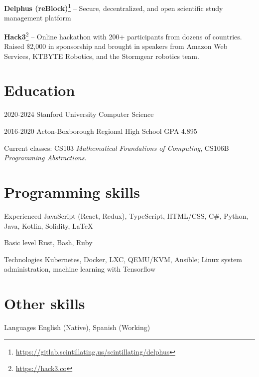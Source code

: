 \documentclass[paper=letter]{tccv}
\begin{document}
\textbf{Delphus
(reBlock)}\footnote{\url{https://gitlab.scintillating.us/scintillating/delphus}}
-- Secure, decentralized, and open scientific study management platform

\textbf{Hack3}\footnote{\url{https://hack3.co}} -- Online hackathon with 200+
participants from dozens of countries. Raised \$2,000 in sponsorship and brought
in speakers from Amazon Web Services, KTBYTE Robotics, and the Stormgear
robotics team. 

\textbf{}

\section{Education}

\begin{yearlist}
     \item{2020-2024}
          {Stanford University} {Computer Science}
     \item{2016-2020}
          {Acton-Boxborough Regional High School} {GPA 4.895}
\end{yearlist}

Current classes: CS103 \textit{Mathematical Foundations of Computing}, CS106B
\textit{Programming Abstractions}.

\section{Programming skills}

\begin{factlist}

\item{Experienced}
     {JavaScript (React, Redux), TypeScript, HTML/CSS, C\#, Python, Java,
     Kotlin, Solidity, \LaTeX}

\item{Basic level}
     {Rust, Bash, Ruby}

\item{Technologies}
     {Kubernetes, Docker, LXC, QEMU/KVM, Ansible; Linux system administration,
     machine learning with Tensorflow}

\end{factlist}

\section{Other skills}

\begin{factlist}

     \item{Languages}
          {English (Native), Spanish (Working)}
     
\end{factlist}
\end{document}
